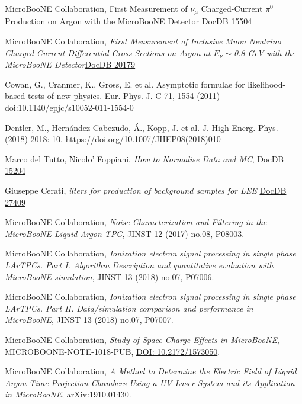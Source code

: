 \documentclass[a4paper]{article}
\begin{document}
\begin{thebibliography}{}
 MicroBooNE Collaboration, First Measurement of $\nu_\mu$ Charged-Current $\pi^0$ Production on Argon with the MicroBooNE Detector \href{https://microboone-docdb.fnal.gov/cgi-bin/private/RetrieveFile?docid=15504&filename=MicroBooNE_CCPizero_Run1_FinalVersion.pdf&version=17}{DocDB 15504}

 MicroBooNE Collaboration, \emph{First Measurement of Inclusive Muon Neutrino Charged Current Differential Cross Sections on Argon at $E_\nu \sim$0.8 GeV with the MicroBooNE Detector}\href{https://microboone-docdb.fnal.gov/cgi-bin/private/RetrieveFile?docid=20179&filename=ccinclusive_paper_prl_v4.9.pdf&version=19}{DocDB 20179}


Cowan, G., Cranmer, K., Gross, E. et al. Asymptotic formulae for likelihood-based tests of new physics. Eur. Phys. J. C 71, 1554 (2011) doi:10.1140/epjc/s10052-011-1554-0

Dentler, M., Hernández-Cabezudo, Á., Kopp, J. et al. J. High Energ. Phys. (2018) 2018: 10. https://doi.org/10.1007/JHEP08(2018)010

Marco del Tutto, Nicolo' Foppiani. \emph{How to Normalise Data and MC}, \href{https://microboone-docdb.fnal.gov/cgi-bin/private/ShowDocument?docid=15204}{DocDB 15204}

Giuseppe Cerati, \emph{ilters for production of background samples for LEE} \href{https://microboone-docdb.fnal.gov/cgi-bin/private/ShowDocument?docid=27409}{DocDB 27409}

MicroBooNE Collaboration, \emph{Noise Characterization and Filtering in the MicroBooNE Liquid Argon TPC}, JINST 12 (2017) no.08, P08003.

MicroBooNE Collaboration, \emph{Ionization electron signal processing in single phase LArTPCs. Part I. Algorithm Description and quantitative evaluation with MicroBooNE simulation}, JINST 13 (2018) no.07, P07006.


MicroBooNE Collaboration, \emph{Ionization electron signal processing in single phase LArTPCs. Part II. Data/simulation comparison and performance in MicroBooNE}, JINST 13 (2018) no.07, P07007.

MicroBooNE Collaboration, \emph{Study of Space Charge Effects in MicroBooNE}, MICROBOONE-NOTE-1018-PUB, \href{http://inspirehep.net/record/1763018}{DOI: 10.2172/1573050}.

MicroBooNE Collaboration, \emph{A Method to Determine the Electric Field of Liquid Argon Time Projection Chambers Using a UV Laser System and its Application in MicroBooNE},  arXiv:1910.01430.

\end{thebibliography}
\end{document}
